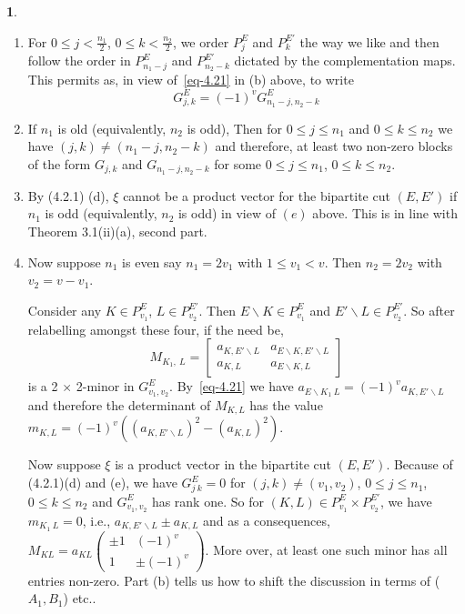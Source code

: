 \documentclass[a4paper,12pt]{article}
\theoremstyle{definition}
\theoremstyle{underlinethm}
\theoremstyle{definition}
\newtheorem{subsubsec}{}[subsection]
\begin{document}
\begin{subsubsec}
\begin{enumerate}[label=(\alph*)]
\item For $0 \leq j < \frac{n_{1}}{2}$, $0 \leq k < \frac{n_{2}}{2}$, we order $P_{j}^{E}$ and $P_{k}^{E'}$ the way we like and then follow the order in $P_{n_{1}-j}^{E}$ and $P_{n_{2}-k}^{E'}$ dictated by the complementation maps. This permits as, in view of~\eqref{eq-4.21} in (b) above, to write
\begin{equation}
G_{j,k}^{E} = (-1)^{v} G_{n_{1}-j, n_{2}-k}^{E} \tag{4.22}\label{eq-4.22}
\end{equation}

\item If $n_{1}$ is old (equivalently, $n_{2}$ is odd), Then for $0 \leq j \leq n_{1}$ and $0 \leq k \leq n_{2}$ we have $(j,k) \neq (n_{1}-j, n_{2}-k)$ and therefore, at least two non-zero blocks of the form $G_{j,k}$ and $G_{n_{1}-j, n_{2}-k}$ for some $0\leq j \leq n_{1}$, $0 \leq k \leq n_{2}$. 

\item By (4.2.1) (d), $\xi$ cannot be a product vector for the bipartite cut $(E, E')$ if $n_{1}$ is odd (equivalently, $n_{2}$ is odd) in view of $(e)$ above. This is in line with Theorem 3.1(ii)(a), second part.

\item Now suppose $n_{1}$ is even say $n_{1}=2v_{1}$ with $1 \leq v_{1} < v$. Then $n_{2}=2v_{2}$ with $v_{2}=v-v_{1}$.

Consider any $K \in P_{v_{1}}^{E}$, $L \in P_{v_{2}}^{E'}$. Then $E \smallsetminus K \in P_{v_{1}}^{E}$ and $E'\smallsetminus L \in P_{v_{2}}^{E'}$. So after relabelling amongst these four, if the need be,
\begin{equation*}
M_{K_{1},~L} = 
\begin{bmatrix}
a_{K,E' \smallsetminus L} &  a_{E \smallsetminus K, E'\smallsetminus L}\\ 
a_{K,L} & a_{E \smallsetminus K, L}\tag{4.23}\label{eq-4.23}
\end{bmatrix}
\end{equation*}
is a 2 $\times$ 2-minor in $G_{v_{1}, v_{2}}^{E}$. By~\eqref{eq-4.21} we have $a_{E \smallsetminus K_{1}~L} = (-1)^{v} a_{K, E'\smallsetminus L}$ and therefore the determinant of $M_{K, L}$ has the value $m_{K,L} = (-1)^{v} \left((a_{K, E' \smallsetminus L})^{2} - (a_{K, L})^{2} \right)$.

Now suppose $\xi$ is a product vector in the bipartite cut $(E, E')$. Because of (4.2.1)(d) and (e), we have $G_{j~k}^{E}=0$ for $(j,k) \neq (v_{1}, v_{2}) $, $0 \leq j \leq n_{1}$, $0 \leq k \leq n_{2}$ and $G_{v_{1}, v_{2}}^{E}$ has rank one. So for $(K, L) \in P_{v_{1}}^{E} \times P_{v_{2}}^{E'}$, we have $m_{K_{1}~L} = 0$, i.e., $a_{K, E'\smallsetminus L} \pm a_{K, L} $ and as a consequences, $M_{KL}= a_{KL}\begin{pmatrix}\pm 1 & (-1)^{v} \\ 1 & \pm (-1)^{v}\end{pmatrix}$. More over, at least one such minor has all entries non-zero. Part (b) tells us how to shift the discussion in terms of ($A_{1}, B_{1}$) etc..


\end{enumerate}
\end{subsubsec}
\end{document}

